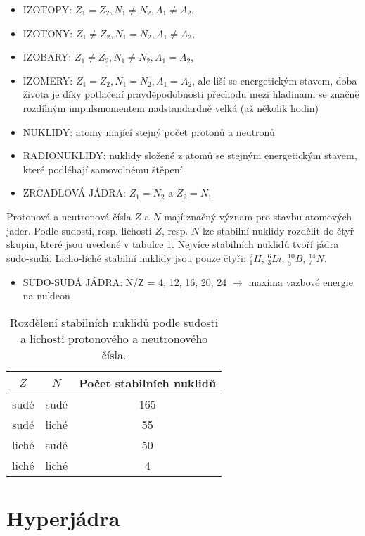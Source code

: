 \documentclass[../../main.tex]{subfiles}
\begin{document}
\begin{itemize}
	\item IZOTOPY: $Z_1 = Z_2, N_1 \neq N_2, A_1 \neq A_2$,
	\item IZOTONY: $Z_1 \neq Z_2, N_1 = N_2, A_1 \neq A_2$,
	\item IZOBARY: $Z_1 \neq Z_2, N_1 \neq N_2, A_1 = A_2$,
	\item IZOMERY: $Z_1 = Z_2, N_1 = N_2, A_1 = A_2$, ale liší se energetickým stavem, doba života je díky potlačení pravděpodobnosti přechodu mezi hladinami se značně rozdílným impulsmomentem nadstandardně velká (až několik hodin) 
	\item NUKLIDY: atomy mající stejný počet protonů a neutronů
	\item RADIONUKLIDY: nuklidy složené z atomů se stejným energetickým stavem, které podléhají samovolnému štěpení
	\item ZRCADLOVÁ JÁDRA: $Z_1 = N_2$ a $Z_2 = N_1$
\end{itemize}

Protonová a neutronová čísla $Z$ a $N$ mají značný význam pro stavbu atomových jader. Podle sudosti, resp. lichosti $Z$, resp. $N$ lze stabilní nuklidy rozdělit do čtyř skupin, které jsou uvedené v tabulce \ref{sf6tab:1}. Nejvíce stabilních nuklidů tvoří jádra sudo-sudá. Licho-liché stabilní nuklidy jsou pouze čtyři: $^{2}_{1}H$, $^{6}_{3}Li$, $^{10}_{5}B$, $^{14}_{7}N$.

\begin{itemize}
	\item SUDO-SUDÁ JÁDRA: N/Z = 4, 12, 16, 20, 24 $\rightarrow$ maxima  vazbové energie na nukleon
\end{itemize}

 \begin{table}[h!]
 	\centering
 	\begin{tabular}{|c||c|c|}
 		\hline $Z$ & $N$ & Počet stabilních nuklidů  \\ 
 		\hline \hline sudé  & sudé & 165 \\ 
 		\hline \hline sudé & liché & 55  \\
 		\hline \hline liché  & sudé & 50 \\ 
 		\hline \hline liché & liché & 4  \\
 		\hline 
 	\end{tabular} 
 	\caption{Rozdělení stabilních nuklidů podle sudosti a lichosti protonového a neutronového čísla.}
 	\label{sf6tab:1}
 \end{table}

\section{Hyperjádra}
\end{document}
